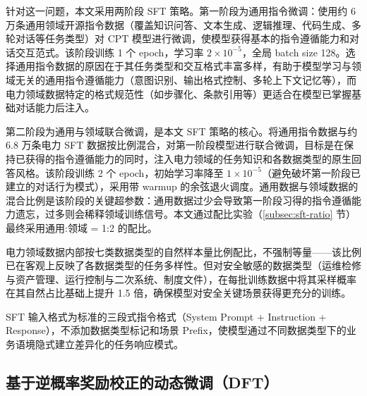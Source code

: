 \documentclass[fontset=fandol,type=master,campus=shenzhen,etitleauto=true]{hithesisbook}
\begin{document}
针对这一问题，本文采用两阶段 SFT 策略。第一阶段为通用指令微调：使用约 6 万条通用领域开源指令数据（覆盖知识问答、文本生成、逻辑推理、代码生成、多轮对话等任务类型）对 CPT 模型进行微调，使模型获得基本的指令遵循能力和对话交互范式。该阶段训练 1 个 epoch，学习率 $2 \times 10^{-5}$，全局 batch size 128。选择通用指令数据的原因在于其任务类型和交互格式丰富多样，有助于模型学习与领域无关的通用指令遵循能力（意图识别、输出格式控制、多轮上下文记忆等），而电力领域数据特定的格式规范性（如步骤化、条款引用等）更适合在模型已掌握基础对话能力后注入。

第二阶段为通用与领域联合微调，是本文 SFT 策略的核心。将通用指令数据与约 6.8 万条电力 SFT 数据按比例混合，对第一阶段模型进行联合微调，目标是在保持已获得的指令遵循能力的同时，注入电力领域的任务知识和各数据类型的原生回答风格。该阶段训练 2 个 epoch，初始学习率降至 $1 \times 10^{-5}$（避免破坏第一阶段已建立的对话行为模式），采用带 warmup 的余弦退火调度。通用数据与领域数据的混合比例是该阶段的关键超参数：通用数据过少会导致第一阶段习得的指令遵循能力遗忘，过多则会稀释领域训练信号。本文通过配比实验（\ref{subsec:sft-ratio} 节）最终采用通用:领域 = 1:2 的配比。

电力领域数据内部按七类数据类型的自然样本量比例配比，不强制等量------该比例已在客观上反映了各数据类型的任务多样性。但对安全敏感的数据类型（运维检修与资产管理、运行控制与二次系统、制度文件），在每批训练数据中将其采样概率在其自然占比基础上提升 1.5 倍，确保模型对安全关键场景获得更充分的训练。

SFT 输入格式为标准的三段式指令格式（System Prompt + Instruction + Response），不添加数据类型标记和场景 Prefix，使模型通过不同数据类型下的业务语境隐式建立差异化的任务响应模式。

\subsection{基于逆概率奖励校正的动态微调（DFT）}\label{ux8badux7ec3ux914dux7f6eux4e0eux4f18ux5316}
\end{document}
